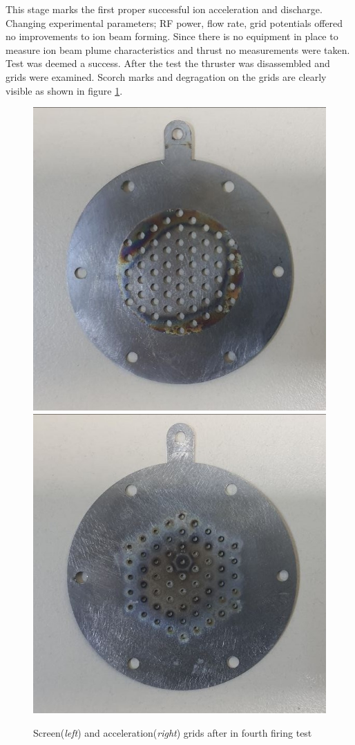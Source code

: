 This stage marks the first proper successful ion acceleration and discharge. Changing experimental parameters; RF power, flow rate, grid potentials offered no improvements to ion beam forming. Since there is no equipment in place to measure ion beam plume characteristics and thrust no measurements were taken. Test was deemed a success. After the test the thruster was disassembled and grids were examined. Scorch marks and degragation on the grids are clearly visible as shown in figure \ref{fig:4th_grideg}.

\begin{figure}[ht]
    \centering
    \includegraphics[width=0.4\linewidth]{fig/deneme4/test4_screen_after.jpg}
    \includegraphics[width=0.4\linewidth]{fig/deneme4/test4_accel_after.jpg}
    \caption{Screen(\textit{left}) and acceleration(\textit{right}) grids after in fourth firing test}
    \label{fig:4th_grideg}
\end{figure}





